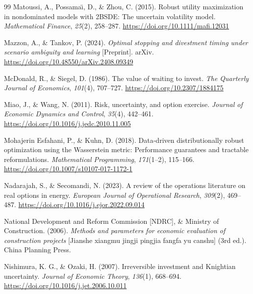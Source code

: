 \documentclass[5p,times,authoryear]{elsarticle}
\theoremstyle{plain}
\begin{document}
\begin{thebibliography}{99}
Matoussi, A., Possama\"{\i}, D., \& Zhou, C. (2015). Robust utility maximization in nondominated models with 2BSDE: The uncertain volatility model. \emph{Mathematical Finance}, \emph{25}(2), 258--287. \url{https://doi.org/10.1111/mafi.12031}

Mazzon, A., \& Tankov, P. (2024). \emph{Optimal stopping and divestment timing under scenario ambiguity and learning} [Preprint]. arXiv. \url{https://doi.org/10.48550/arXiv.2408.09349}

McDonald, R., \& Siegel, D. (1986). The value of waiting to invest. \emph{The Quarterly Journal of Economics}, \emph{101}(4), 707--727. \url{https://doi.org/10.2307/1884175}

Miao, J., \& Wang, N. (2011). Risk, uncertainty, and option exercise. \emph{Journal of Economic Dynamics and Control}, \emph{35}(4), 442--461. \url{https://doi.org/10.1016/j.jedc.2010.11.005}

Mohajerin Esfahani, P., \& Kuhn, D. (2018). Data-driven distributionally robust optimization using the Wasserstein metric: Performance guarantees and tractable reformulations. \emph{Mathematical Programming}, \emph{171}(1--2), 115--166. \url{https://doi.org/10.1007/s10107-017-1172-1}

Nadarajah, S., \& Secomandi, N. (2023). A review of the operations literature on real options in energy. \emph{European Journal of Operational Research}, \emph{309}(2), 469--487. \url{https://doi.org/10.1016/j.ejor.2022.09.014}

National Development and Reform Commission [NDRC], \& Ministry of Construction. (2006). \emph{Methods and parameters for economic evaluation of construction projects} [Jianshe xiangmu jingji pingjia fangfa yu canshu] (3rd ed.). China Planning Press.

Nishimura, K. G., \& Ozaki, H. (2007). Irreversible investment and Knightian uncertainty. \emph{Journal of Economic Theory}, \emph{136}(1), 668--694. \url{https://doi.org/10.1016/j.jet.2006.10.011}


\end{thebibliography}
\end{document}
